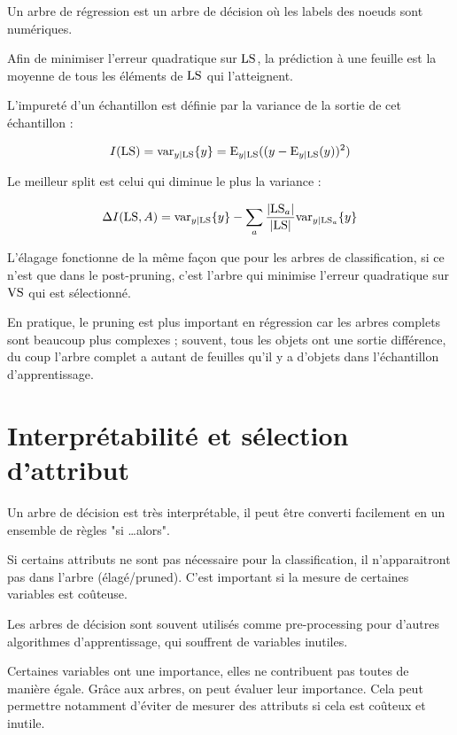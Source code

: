 	Un arbre de régression est un arbre de décision où les labels des noeuds sont numériques.
	

	
	Afin de minimiser l'erreur quadratique sur $\text{LS}$, la prédiction à une feuille est la moyenne de tous les éléments de $\text{LS}$ qui l'atteignent.
	
	L'impureté d'un échantillon est définie par la variance de la sortie de cet échantillon :
	
	$$I(\text{LS}) = \text{var}_{y \vert \text{LS}} \lbrace y \rbrace = \text{E}_{y \vert \text{LS}}((y - \text{E}_{y \vert \text{LS}}(y))^2)$$
	
	Le meilleur split est celui qui diminue le plus la variance :
	
	$$\Delta I(\text{LS}, A) =\text{var}_{y \vert \text{LS}} \lbrace y \rbrace - \sum_a \frac{\vert \text{LS}_a \vert}{\vert \text{LS} \vert} \text{var}_{y \vert \text{LS}_a} \lbrace y \rbrace$$

	L'élagage fonctionne de la même façon que pour les arbres de classification, si ce n'est que dans le post-pruning, c'est l'arbre qui minimise l'erreur quadratique sur $\text{VS}$ qui est sélectionné.
	
	En pratique, le pruning est plus important en régression car les arbres complets sont beaucoup plus complexes ; souvent, tous les objets ont une sortie différence, du coup l'arbre complet a autant de feuilles qu'il y a d'objets dans l'échantillon d'apprentissage.


\section{Interprétabilité et sélection d'attribut}
	
	Un arbre de décision est très interprétable, il peut être converti facilement en un ensemble de règles "si \dots alors".
	
	Si certains attributs ne sont pas nécessaire pour la classification, il n'apparaitront pas dans l'arbre (élagé/pruned). C'est important si la mesure de certaines variables est coûteuse.
	
	Les arbres de décision sont souvent utilisés comme pre-processing pour d'autres algorithmes d'apprentissage, qui souffrent de variables inutiles.
	
	Certaines variables ont une importance, elles ne contribuent pas toutes de manière égale. Grâce aux arbres, on peut évaluer leur importance. Cela peut permettre notamment d'éviter de mesurer des attributs si cela est coûteux et inutile.
	

